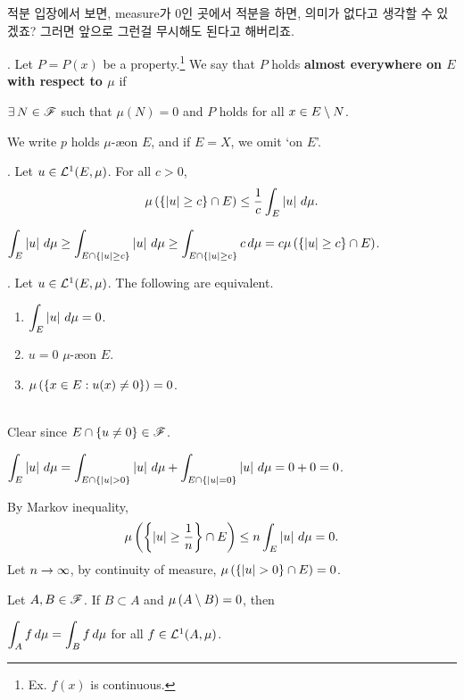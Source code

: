 \pagebreak

적분 입장에서 보면, measure가 0인 곳에서 적분을 하면, 의미가 없다고 생각할 수 있겠죠? 그러면 앞으로 그런걸 무시해도 된다고 해버리죠.

.  Let \(P = P(x)\) be a property.\footnote{Ex. \(f(x)\) is continuous.} We say that \(P\) holds \textbf{almost everywhere on \(E\) with respect to \(\mu\)} if
\begin{center}
    \(\exists N \in \scr{F}\) such that \(\mu(N) = 0\) and \(P\) holds for all \(x \in E \setminus N\).
\end{center}

\notation We write \(p\) holds \(\mu\)-\ae on \(E\), and if \(E = X\), we omit `on \(E\)'.

\thm.  Let \(u \in \mathcal{L}^{1}(E, \mu)\). For all \(c > 0\),
\[
    \mu\left( \{\left| u \right| \geq c\} \cap E \right) \leq \frac{1}{c} \int_E \left| u \right| \,d{\mu}.
\]

\pf \(\displaystyle \int_E \left| u \right| \,d{\mu} \geq \int_{E\cap \{\left| u \right|\geq c\}} \left| u \right| \,d{\mu} \geq \int_{E\cap \{\left| u \right|\geq c\}} c \,d{\mu} = c \mu\left( \{\left| u \right| \geq c\} \cap E \right)\).

\thm. Let \(u\in \mathcal{L}^{1}(E, \mu)\). The following are equivalent.
\begin{enumerate}
    \item \(\displaystyle \int_E \left| u \right| \,d{\mu} = 0\).
    \item \(u = 0\) \(\mu\)-\ae on \(E\).
    \item \(\mu\left( \{x \in E : u(x) \neq 0\} \right) = 0\).
\end{enumerate}

\pf \\
 Clear since \(E\cap\{u\neq 0\} \in \mathscr{F}\).

 \(\displaystyle \int_E \left| u \right| \,d{\mu} = \int_{E \cap \{\left| u \right| > 0\}} \left| u \right| \,d{\mu} + \int_{E \cap \{\left| u \right| = 0\}} \left| u \right| \,d{\mu} = 0 + 0 = 0\).

 By Markov inequality,
\[
    \mu\left( \left\{\left| u \right| \geq \frac{1}{n}\right\} \cap E \right) \leq n\int_E \left| u \right| \,d{\mu} = 0.
\]
Let \(n\rightarrow \infty\), by continuity of measure, \(\mu\left( \{\left| u \right| > 0\} \cap E \right) = 0\).

\rmk Let \(A, B \in \mathscr{F}\). If \(B \subset A\) and \(\mu\left( A \setminus B \right) = 0\), then
\begin{center}
    \(\displaystyle \int_A f \,d{\mu} = \int_B f \,d{\mu}\) for all \(f \in \mathcal{L}^{1}(A, \mu)\).
\end{center}

